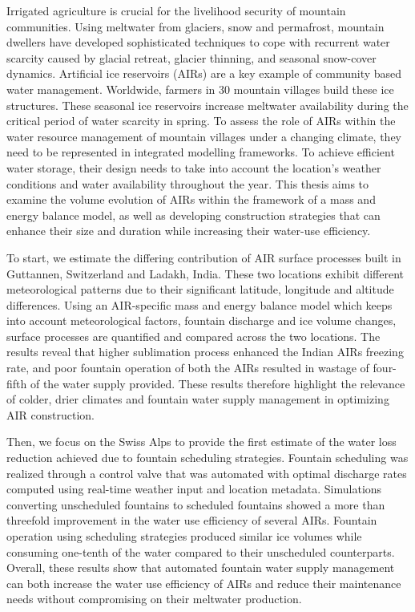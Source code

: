 %
\label{sec:abstract}

Irrigated agriculture is crucial for the livelihood security of mountain communities. Using meltwater from
glaciers, snow and permafrost, mountain dwellers have developed sophisticated techniques to cope with recurrent
water scarcity caused by glacial retreat, glacier thinning, and seasonal snow-cover dynamics. Artificial ice
reservoirs (AIRs) are a key example of community based water management. Worldwide, farmers in 30 mountain
villages build these ice structures. These seasonal ice reservoirs increase meltwater availability during the
critical period of water scarcity in spring. To assess the role of AIRs within the water resource management of
mountain villages under a changing climate, they need to be represented in integrated modelling frameworks. To
achieve efficient water storage, their design needs to take into account the location's weather conditions and
water availability throughout the year. This thesis aims to examine the volume evolution of AIRs within the framework of a mass and
energy balance model, as well as developing construction strategies that can enhance their size and duration
while increasing their water-use efficiency. 

To start, we estimate the differing contribution of AIR surface processes built in Guttannen, Switzerland and
Ladakh, India. These two locations exhibit different meteorological patterns due to their significant latitude,
longitude and altitude differences. Using an AIR-specific mass and energy balance model which keeps into account
meteorological factors, fountain discharge and ice volume changes, surface processes are quantified and compared
across the two locations. The results reveal that higher sublimation process enhanced the Indian AIRs freezing
rate, and poor fountain operation of both the AIRs resulted in wastage of four-fifth of the water supply
provided. These results therefore highlight the relevance of colder, drier climates and fountain water supply
management in optimizing  AIR construction.  

Then, we focus on the Swiss Alps to provide the first estimate of the water loss reduction achieved due to
fountain scheduling strategies. Fountain scheduling was realized through a control valve that was automated with
optimal discharge rates computed using real-time weather input and location metadata. Simulations converting
unscheduled fountains to scheduled fountains showed a more than threefold improvement in the water use
efficiency of several AIRs. Fountain operation using scheduling strategies produced similar ice volumes while
consuming one-tenth of the water compared to their unscheduled counterparts.  Overall, these results show that
automated fountain water supply management can both increase the water use efficiency of AIRs and reduce their
maintenance needs without compromising on their meltwater production.

